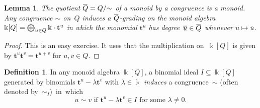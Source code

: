 \documentclass[12pt]{amsart}
\numberwithin{equation}{section}
\newtheorem{lemma}[thm]{Lemma}
\theoremstyle{definition}
\newtheorem{defn}[thm]{Definition}
\begin{document}
\begin{lemma}
The quotient ${\hspace{.15ex}{{\overline{{\hspace{-.15ex}Q\hspace{-.25ex}}}}{}}\hspace{.25ex}} = Q/{\mathord\sim}$ of a monoid by a congruence is a monoid.
Any congruence ${\mathord\sim}$ on~$Q$ induces a ${\hspace{.15ex}{{\overline{{\hspace{-.15ex}Q\hspace{-.25ex}}}}{}}\hspace{.25ex}}$-grading on the
\emph{monoid algebra} ${\Bbbk}[Q] = \bigoplus_{u \in Q} {\Bbbk}
\cdot\nolinebreak {\mathbf{t}}^u$ in which the \emph{monomial} ${\mathbf{t}}^u$ has
\emph{degree}~${{\overline{u}}{}} \in {\hspace{.15ex}{{\overline{{\hspace{-.15ex}Q\hspace{-.25ex}}}}{}}\hspace{.25ex}}$ whenever $u \mapsto {{\overline{u}}{}}$.
\end{lemma}
\begin{proof}
This is an easy exercise.  It uses that the multiplication on~${\Bbbk}[Q]$
is given by ${\mathbf{t}}^u {\mathbf{t}}^v = {\mathbf{t}}^{u+v}$ for $u,v \in Q$.
\end{proof}

\begin{defn}\label{d:induced}
In any monoid algebra ${\Bbbk}[Q]$, a binomial ideal $I \subseteq {\Bbbk}[Q]$
generated by binomials ${\mathbf{t}}^u - \lambda{\mathbf{t}}^v$ with $\lambda \in {\Bbbk}$
\emph{induces} a congruence~${\mathord\sim}$ (often denoted by~${\mathord\sim}_I$)~in~which
$$  u \sim v \text{ if } {\mathbf{t}}^u - \lambda{\mathbf{t}}^v \in I \text{ for some }
  \lambda \neq 0.
$$
\end{defn}
\end{document}
